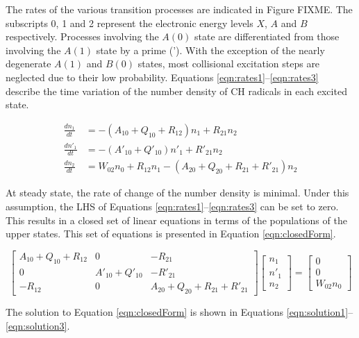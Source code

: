 The rates of the various transition processes are indicated in Figure FIXME.
The subscripts 0, 1 and 2 represent the electronic energy levels \(X\), \(A\) and \(B\) respectively.
Processes involving the \(A(0)\) state are differentiated from those involving the \(A(1)\) state by a prime (').
With the exception of the nearly degenerate \(A(1)\) and \(B(0)\) states, most collisional excitation steps are neglected due to their low probability.
Equations \ref{eqn:rates1}--\ref{eqn:rates3} describe the time variation of the number density of CH radicals in each excited state.

\begin{align}
\frac{dn_1}{dt} &= -( A_{10} + Q_{10} + R_{12} )n_1 + R_{21}n_2
\label{eqn:rates1}\\
\frac{dn'_1}{dt} &= -( A'_{10} + Q'_{10} )n'_1 + R'_{21}n_2
\label{eqn:rates2}\\
\frac{dn_2}{dt} &= W_{02}n_0 + R_{12}n_1 - ( A_{20} + Q_{20} + R_{21} + R'_{21} )n_2
\label{eqn:rates3}
\end{align}

At steady state, the rate of change of the number density is minimal.
Under this assumption, the LHS of Equations \ref{eqn:rates1}--\ref{eqn:rates3} can be set to zero.
This results in a closed set of linear equations in terms of the populations of the upper states.
This set of equations is presented in Equation \ref{eqn:closedForm}.

\begin{equation}
  \left[
    \begin{matrix}
      A_{10} + Q_{10} + R_{12} & 0 & -R_{21}\\
      0 & A'_{10} + Q'_{10} & -R'_{21}\\
      -R_{12} & 0 & A_{20} + Q_{20} + R_{21} + R'_{21}
    \end{matrix}
  \right]\left[
    \begin{matrix}
      n_1\\
      n'_1\\
      n_2
    \end{matrix}
  \right] = \left[
    \begin{matrix}
      0\\
      0\\
      W_{02}n_0
    \end{matrix}
  \right]
  \label{eqn:closedForm}
\end{equation}

The solution to Equation \ref{eqn:closedForm} is shown in Equations \ref{eqn:solution1}--\ref{eqn:solution3}.

